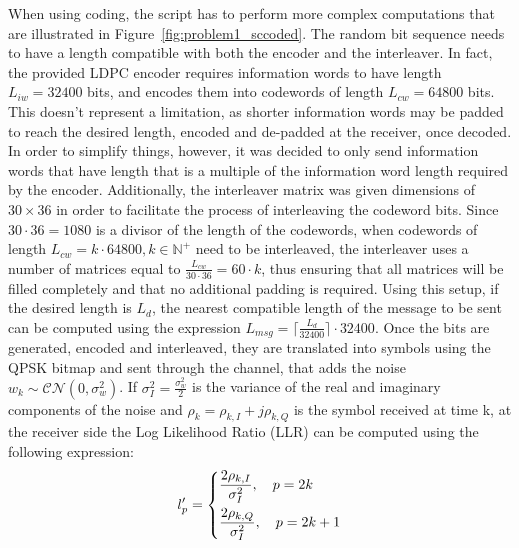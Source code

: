 \documentclass[10pt]{article}
\begin{document}

When using coding, the script has to perform more complex computations that are illustrated in Figure~\ref{fig:problem1_sccoded}. The random bit sequence needs to have a length compatible with both the encoder and the interleaver. In fact, the provided LDPC encoder requires information words to have length $L_{iw} = 32400$ bits, and encodes them into codewords of length $L_{cw} = 64800$ bits. This doesn't represent a limitation, as shorter information words may be padded to reach the desired length, encoded and de-padded at the receiver, once decoded. In order to simplify things, however, it was decided to only send information words that have length that is a multiple of the information word length required by the encoder. Additionally, the interleaver matrix was given dimensions of $30 \times 36$ in order to facilitate the process of interleaving the codeword bits. Since $30 \cdot 36 = 1080$ is a divisor of the length of the codewords, when codewords of length $L_{cw} = k \cdot 64800, k \in \mathbb{N^{+}}$ need to be interleaved, the interleaver uses a number of matrices equal to $\frac{L_{cw}}{30\cdot36} = 60 \cdot k$, thus ensuring that all matrices will be filled completely and that no additional padding is required. Using this setup, if the desired length is $L_d$, the nearest compatible length of the message to be sent can be computed using the expression $L_{msg} = \lceil \frac{L_{d}}{32400} \rceil \cdot 32400$. Once the bits are generated, encoded and interleaved, they are translated into symbols using the QPSK bitmap and sent through the channel, that adds the noise $w_k \sim \mathcal{CN}(0, \sigma_w^2)$. If $\sigma^2_I = \frac{\sigma^2_w}{2}$ is the variance of the real and imaginary components of the noise and $\rho_k = \rho_{k,I} + j \rho_{k,Q}$ is the symbol received at time k, at the receiver side the Log Likelihood Ratio (LLR) can be computed using the following expression:
\begin{equation}
	l'_p =
	\begin{dcases}
	\frac{2 \rho_{k,I}}{\sigma_I^2}, \quad p = 2k \\
	\frac{2 \rho_{k,Q}}{\sigma_I^2}, \quad p = 2k +1
	\end{dcases}
\end{equation}
\end{document}
